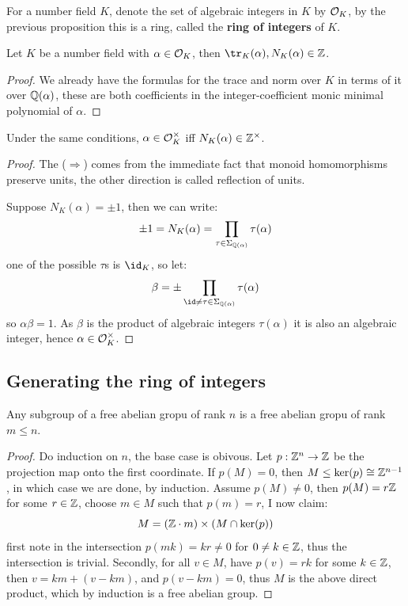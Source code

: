 \documentclass{article}
\begin{document}
\begin{definition}
    For a number field $K$, denote the set of algebraic integers in $K$ by $\mathcal{O}_K$, by the previous proposition this is a ring, called the \textbf{ring of integers} of $K$.
\end{definition}

\begin{proposition}
    Let $K$ be a number field with $\alpha\in\mathcal{O}_K$, then $\tr_K(\alpha),N_K(\alpha)\in\bZ$.
    \begin{proof}
        We already have the formulas for the trace and norm over $K$ in terms of it over $\mathbb{Q}(\alpha)$, these are both coefficients in the integer-coefficient monic minimal polynomial of $\alpha$.
    \end{proof}
\end{proposition}

\begin{proposition}
    Under the same conditions, $\alpha\in\mathcal{O}_K^\times$ iff $N_K(\alpha)\in\mathbb{Z}^\times$.
    \begin{proof}
        The ($\Rightarrow$) comes from the immediate fact that monoid homomorphisms preserve units, the other direction is called reflection of units.

        Suppose $N_K(\alpha)=\pm 1$, then we can write: \[
        \pm 1 = N_K(\alpha) = \prod_{\tau\in\Sigma_{\mathbb{Q}(\alpha)}}\tau(\alpha)
        \] one of the possible $\tau$s is $\id_K$, so let: \[
        \beta = \pm\prod_{\id\neq\tau\in\Sigma_{\bQ(\alpha)}}\tau(\alpha)
        \] so $\alpha\beta=1$. As $\beta$ is the product of algebraic integers $\tau(\alpha)$ it is also an algebraic integer, hence $\alpha\in\mathcal{O}_K^\times$.
    \end{proof}
\end{proposition}

\subsection{Generating the ring of integers}

\begin{lemma}
    Any subgroup of a free abelian gropu of rank $n$ is a free abelian gropu of rank $m\leq n$.
    \begin{proof}
        Do induction on $n$, the base case is obivous. Let $p:\mathbb{Z}^n\rightarrow\mathbb{Z}$ be the projection map onto the first coordinate. If $p(M)=0$, then $M\leq\ker(p)\cong\mathbb{Z}^{n-1}$, in which case we are done, by induction. Assume $p(M)\neq 0$, then $p(M)=r\mathbb{Z}$ for some $r\in \mathbb{Z}$, choose $m\in M$ such that $p(m)=r$, I now claim: \[
        M = (\mathbb{Z}\cdot m)\times (M\cap \ker(p))
        \] first note in the intersection $p(mk)=kr\neq 0$ for $0\neq k\in\mathbb{Z}$, thus the intersection is trivial. Secondly, for all $v\in M$, have $p(v)=rk$ for some $k\in \mathbb{Z}$, then $v = km + (v-km)$, and $p(v-km)=0$, thus $M$ is the above direct product, which by induction is a free abelian group.
    \end{proof}
\end{lemma}
\end{document}
